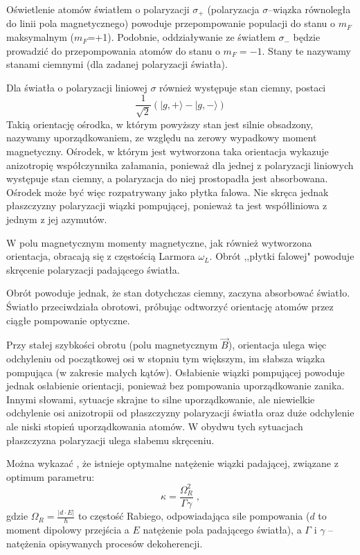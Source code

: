 \documentclass[a4paper,10pt]{article}
\begin{document}
Oświetlenie atomów światłem o polaryzacji $\sigma_+$ (polaryzacja $\sigma$--wiązka równoległa do linii pola magnetycznego) powoduje przepompowanie populacji do stanu o $m_F$ maksymalnym ($m_F$=+1). Podobnie, oddziaływanie ze światłem $\sigma_-$ będzie prowadzić do przepompowania atomów do stanu o $m_F=-1$. Stany te nazywamy stanami ciemnymi (dla zadanej polaryzacji światła).

Dla światła o polaryzacji liniowej $\sigma$ również występuje stan ciemny, postaci
\begin{equation}
\frac{1}{\sqrt{2}} (|g,+\rangle-|g,-\rangle)
\end{equation}
Takią orientację ośrodka, w którym powyższy stan jest silnie obsadzony, nazywamy uporządkowaniem, ze względu na zerowy wypadkowy moment magnetyczny. Ośrodek, w którym jest wytworzona taka orientacja wykazuje anizotropię współczynnika załamania, ponieważ dla jednej z polaryzacji liniowych występuje stan ciemny, a polaryzacja do niej prostopadła jest absorbowana. Ośrodek może być więc rozpatrywany jako płytka falowa. Nie skręca jednak płaszczyzny polaryzacji wiązki pompującej, ponieważ ta jest współliniowa z jednym z jej azymutów.

W polu magnetycznym momenty magnetyczne, jak również wytworzona orientacja, obracają się z częstością Larmora $\omega_L$. Obrót ,,płytki falowej" powoduje skręcenie polaryzacji padającego światła.

Obrót powoduje jednak, że stan dotychczas ciemny, zaczyna absorbować światło. Światło przeciwdziała obrotowi, próbując odtworzyć orientację atomów przez ciągłe pompowanie optyczne.

Przy stałej szybkości obrotu (polu magnetycznym $\vec B$), orientacja ulega więc odchyleniu od początkowej osi w stopniu tym większym, im słabsza wiązka pompująca (w zakresie małych kątów). Osłabienie wiązki pompującej powoduje jednak osłabienie orientacji, ponieważ bez pompowania uporządkowanie zanika. Innymi słowami, sytuacje skrajne to silne uporządkowanie, ale niewielkie odchylenie osi anizotropii od płaszczyzny polaryzacji światła oraz duże odchylenie ale niski stopień uporządkowania atomów. W obydwu tych sytuacjach płaszczyzna polaryzacji ulega słabemu skręceniu.

Można wykazać \cite{srivansan}, że istnieje optymalne natężenie wiązki padającej, związane z optimum parametru:
\begin{equation}
\kappa=\frac{\Omega_R^2}{\Gamma\gamma} \; ,
\end{equation}
gdzie $\Omega_R=\frac{|d \cdot E|}{\hbar}$ to częstość Rabiego, odpowiadająca sile pompowania ($d$ to moment dipolowy przejścia a $E$ natężenie pola padającego światła), a $\Gamma$ i $\gamma$ -- natężenia opisywanych procesów dekoherencji.
\end{document}
